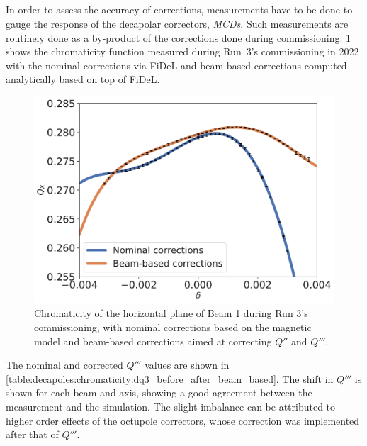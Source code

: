 \subsection{}


In order to assess the accuracy of corrections, measurements have to be done to gauge the response
of the decapolar correctors, \textit{MCDs}.
Such measurements are routinely done as a by-product of the corrections done during commissioning.
\cref{figure:decapoles:chromaticity:dq3_comparison} shows the chromaticity function measured during
Run~3's commissioning in 2022 with the nominal corrections via FiDeL and beam-based corrections
computed analytically based on top of FiDeL.

\begin{figure}[tbh]
    \centering
    \includegraphics[width=0.8\columnwidth]{images/nominal_vs_beam_based_corrections.pdf}
    \caption{Chromaticity of the horizontal plane of Beam 1 during Run 3's commissioning, with
    nominal corrections based on the magnetic model and beam-based corrections aimed at correcting
     $Q''$ and $Q'''$.}
    \label{figure:decapoles:chromaticity:dq3_comparison}
\end{figure}

The nominal and corrected $Q'''$ values are shown in
\cref{table:decapoles:chromaticity:dq3_before_after_beam_based}. The shift in $Q'''$ is shown for
each beam and axis, showing a good agreement between the measurement and the simulation.
The slight imbalance can be attributed to higher order effects of the octupole correctors, whose
correction was implemented after that of $Q'''$.

